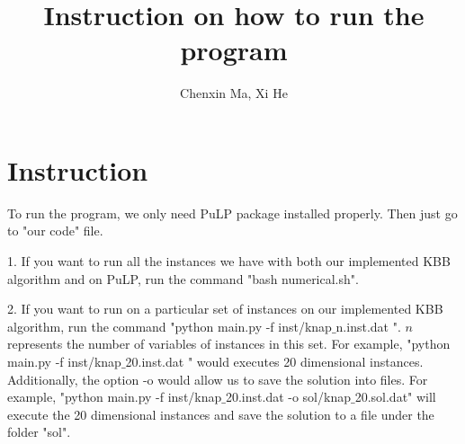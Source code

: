 \documentclass[a4paper,10pt]{article}
\title{Instruction on how to run the program}
\author{Chenxin Ma, Xi He}
\begin{document}
\maketitle
 
\section{Instruction} 

To run the program, we only need PuLP package installed properly. Then just go to "our code" file.

\begin{description}
\item{1.} If you want to run all the instances we have with both our implemented KBB algorithm and on PuLP, run the command "bash numerical.sh".
\item{2.} If you want to run on a particular set of instances on our implemented KBB algorithm, run the command "python main.py -f inst/knap$\_$n.inst.dat ". $n$ represents the number of variables of instances in this set. For example, "python main.py -f inst/knap$\_$20.inst.dat " would executes 20 dimensional instances. Additionally, the option -o would allow us to save the solution into files. For example, "python main.py -f inst/knap$\_$20.inst.dat -o sol/knap$\_$20.sol.dat" will execute the 20 dimensional instances and save the solution to a file under the folder "sol". 
\end{description}

 
\end{document}
